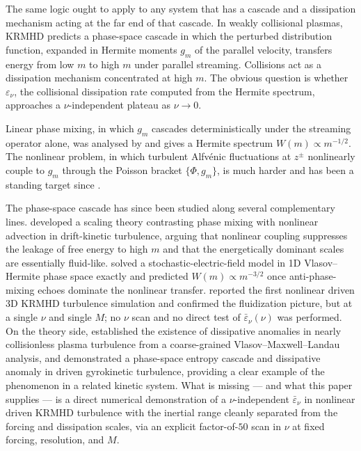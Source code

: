 \documentclass[11pt]{article}
\newcommand{\epsnu}{\varepsilon_\nu}
\newcommand{\zpm}{z^{\pm}}
\begin{document}
The same logic ought to apply to any system that has a cascade and a dissipation mechanism acting at the far end of that cascade. In weakly collisional plasmas, KRMHD \citep{schekochihin2009} predicts a phase-space cascade in which the perturbed distribution function, expanded in Hermite moments $g_m$ of the parallel velocity, transfers energy from low $m$ to high $m$ under parallel streaming. Collisions act as a dissipation mechanism concentrated at high $m$. The obvious question is whether $\epsnu$, the collisional dissipation rate computed from the Hermite spectrum, approaches a $\nu$-independent plateau as $\nu \to 0$.

Linear phase mixing, in which $g_m$ cascades deterministically under the streaming operator alone, was analysed by \citet{zocco2011} and gives a Hermite spectrum $W(m) \propto m^{-1/2}$. The nonlinear problem, in which turbulent Alfv\'enic fluctuations at $\zpm$ nonlinearly couple to $g_m$ through the Poisson bracket $\{\Phi, g_m\}$, is much harder and has been a standing target since \citet{kanekar2015}.

The phase-space cascade has since been studied along several complementary lines. \citet{schekochihin2016} developed a scaling theory contrasting phase mixing with nonlinear advection in drift-kinetic turbulence, arguing that nonlinear coupling suppresses the leakage of free energy to high $m$ and that the energetically dominant scales are essentially fluid-like. \citet{adkins2018} solved a stochastic-electric-field model in 1D Vlasov--Hermite phase space exactly and predicted $W(m) \propto m^{-3/2}$ once anti-phase-mixing echoes dominate the nonlinear transfer. \citet{meyrand2019} reported the first nonlinear driven 3D KRMHD turbulence simulation and confirmed the fluidization picture, but at a single $\nu$ and single $M$; no $\nu$ scan and no direct test of $\bar\epsnu(\nu)$ was performed. On the theory side, \citet{eyink2018} established the existence of dissipative anomalies in nearly collisionless plasma turbulence from a coarse-grained Vlasov--Maxwell--Landau analysis, and \citet{nastac2024} demonstrated a phase-space entropy cascade and dissipative anomaly in driven gyrokinetic turbulence, providing a clear example of the phenomenon in a related kinetic system. What is missing --- and what this paper supplies --- is a direct numerical demonstration of a $\nu$-independent $\bar\epsnu$ in nonlinear driven KRMHD turbulence with the inertial range cleanly separated from the forcing and dissipation scales, via an explicit factor-of-$50$ scan in $\nu$ at fixed forcing, resolution, and $M$.
\end{document}
